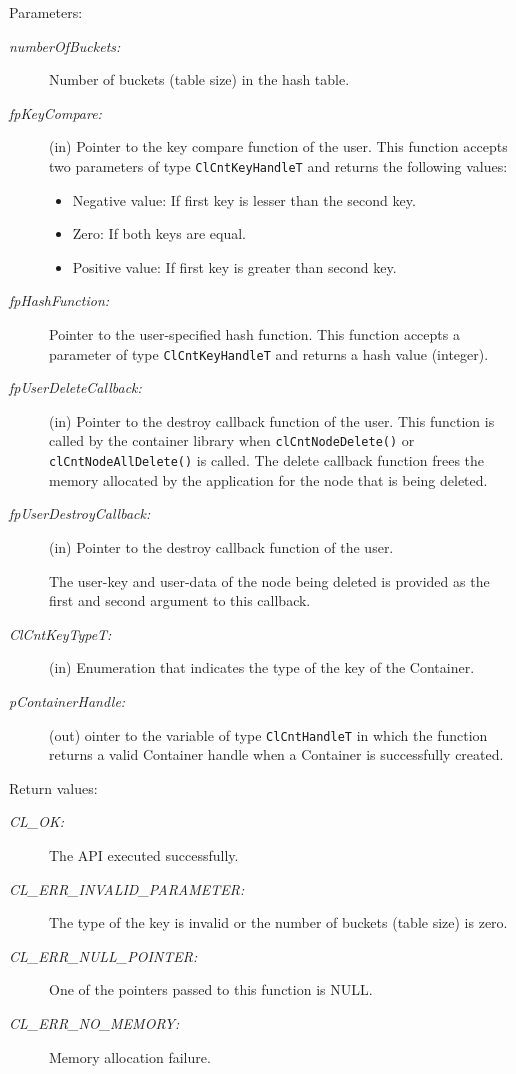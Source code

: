 \begin{Desc}
\item[Parameters:]
\begin{description}
\item[{\em number\-Of\-Buckets:}]Number of buckets (table size) in the hash table.
\item[{\em fp\-Key\-Compare:}](in) Pointer to the key compare function of the user. This function accepts two parameters of type {\tt{ClCntKeyHandleT}}
and returns the following values:
\begin{itemize}
\item
Negative value: If first key is lesser than the second key.
\item
Zero: If both keys are equal.
\item
Positive value: If first key is greater than second key. 
\end{itemize}
 
\item[{\em fp\-Hash\-Function:}]Pointer to the user-specified hash function. This function accepts a parameter of type {\tt{ClCntKeyHandleT}} and returns
a hash value (integer).

\item[{\em fp\-User\-Delete\-Callback:}](in) Pointer to the destroy callback function of the user. This function is called by the container library 
when {\tt{clCntNodeDelete()}} or {\tt{clCntNodeAllDelete()}} is called. The delete callback function frees the memory allocated by the application
for the node that is being deleted.

\item[{\em fp\-User\-Destroy\-Callback:}](in) Pointer to the destroy callback function of the user. 

The user-key and user-data of the node being deleted is provided as the first and second argument to this callback.

\item[{\em Cl\-Cnt\-Key\-Type\-T:}](in) Enumeration that indicates the type of the key of the Container.

\item[{\em p\-Container\-Handle:}](out) ointer to the variable of type {\tt{ClCntHandleT}} in which the function returns a valid Container handle when
a Container is successfully created.
\end{description}
\end{Desc}
\begin{Desc}
\item[Return values:]
\begin{description}
\item[{\em CL\_\-OK:}]The API executed successfully. 
\item[{\em CL\_\-ERR\_\-INVALID\_\-PARAMETER:}] The type of the key is invalid or the number of buckets (table size) is zero. 
\item[{\em CL\_\-ERR\_\-NULL\_\-POINTER:}] One of the pointers passed to this function is NULL.
\item[{\em CL\_\-ERR\_\-NO\_\-MEMORY:}] Memory allocation failure.\end{description}
\end{Desc}
